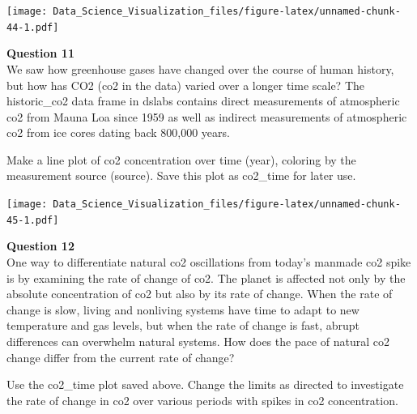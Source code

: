 \documentclass[
]{article}
\newenvironment{Shaded}{\begin{snugshade}}{\end{snugshade}}
\newcommand{\DataTypeTok}[1]{\textcolor[rgb]{0.13,0.29,0.53}{#1}}
\newcommand{\KeywordTok}[1]{\textcolor[rgb]{0.13,0.29,0.53}{\textbf{#1}}}
\newcommand{\NormalTok}[1]{#1}
\newcommand{\OperatorTok}[1]{\textcolor[rgb]{0.81,0.36,0.00}{\textbf{#1}}}
\newcommand{\StringTok}[1]{\textcolor[rgb]{0.31,0.60,0.02}{#1}}
\begin{document}
\begin{Shaded}
\end{Shaded}

\texttt{[image: Data\_Science\_Visualization\_files/figure-latex/unnamed-chunk-44-1.pdf]}

\textbf{Question 11}\\
We saw how greenhouse gases have changed over the course of human
history, but how has CO2 (co2 in the data) varied over a longer time
scale? The historic\_co2 data frame in dslabs contains direct
measurements of atmospheric co2 from Mauna Loa since 1959 as well as
indirect measurements of atmospheric co2 from ice cores dating back
800,000 years.

Make a line plot of co2 concentration over time (year), coloring by the
measurement source (source). Save this plot as co2\_time for later use.

\begin{Shaded}
\end{Shaded}

\texttt{[image: Data\_Science\_Visualization\_files/figure-latex/unnamed-chunk-45-1.pdf]}

\textbf{Question 12}\\
One way to differentiate natural co2 oscillations from today's manmade
co2 spike is by examining the rate of change of co2. The planet is
affected not only by the absolute concentration of co2 but also by its
rate of change. When the rate of change is slow, living and nonliving
systems have time to adapt to new temperature and gas levels, but when
the rate of change is fast, abrupt differences can overwhelm natural
systems. How does the pace of natural co2 change differ from the current
rate of change?

Use the co2\_time plot saved above. Change the limits as directed to
investigate the rate of change in co2 over various periods with spikes
in co2 concentration.
\end{document}
